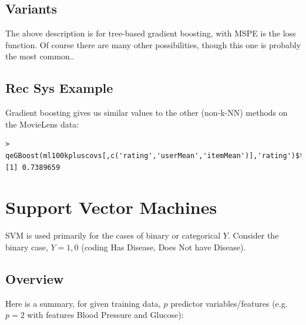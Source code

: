 \subsection{Variants}

The above description is for tree-based gradient boosting, with
MSPE is the loss function.  Of course there are many other
possibilities, though this one is probably the most common..

\subsection{Rec Sys Example}

Gradient boosting gives us similar values to the other (non-k-NN)
methods on the MovieLens data:

\begin{lstlisting}
> qeGBoost(ml100kpluscovs[,c('rating','userMean','itemMean')],'rating')$testAcc
[1] 0.7389659
\end{lstlisting}

\section{Support Vector Machines}

SVM is used primarily for the cases of binary or categorical $Y$.
Consider the binary case, $Y = 1,0$ (coding Has Disease, Does Not have
Disease).  

\subsection{Overview}

Here is a summary, for given training data, $p$ predictor
variables/features (e.g.\  $p = 2$ with features Blood Pressure and
Glucose):


